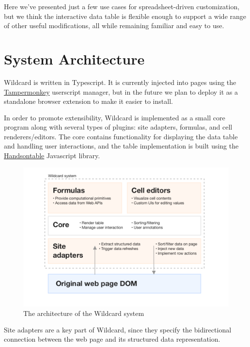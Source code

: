\documentclass[english,submission]{programming}
\begin{document}
Here we've presented just a few use cases for spreadsheet-driven
customization, but we think the interactive data table is flexible
enough to support a wide range of other useful modifications, all while
remaining familiar and easy to use.

\hypertarget{system-architecture}{%
\section{System Architecture}\label{system-architecture}}

Wildcard is written in Typescript. It is currently injected into pages
using the \href{https://www.tampermonkey.net/}{Tampermonkey} userscript
manager, but in the future we plan to deploy it as a standalone browser
extension to make it easier to install.

In order to promote extensibility, Wildcard is implemented as a small
core program along with several types of plugins: site adapters,
formulas, and cell renderers/editors. The core contains functionality
for displaying the data table and handling user interactions, and the
table implementation is built using the
\href{https://handsontable.com/}{Handsontable} Javascript library.

\begin{figure}
\hypertarget{fig:architecture}{%
\centering
\includegraphics{media/architecture-clean.png}
\caption{The architecture of the Wildcard
system}\label{fig:architecture}
}
\end{figure}

Site adapters are a key part of Wildcard, since they specify the
bidirectional connection between the web page and its structured data
representation.
\end{document}
